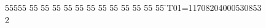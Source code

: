 %
%
\begin{tabbing}
55555 \= 55 \= 55 \= 55 \= 55 \= 55 \= 55 \= 55 \= 55 \= 55 \= 55 \= 55 \= 55 \= \>T01=11708204000530853\\[0pt]
2\>\end{tabbing}

